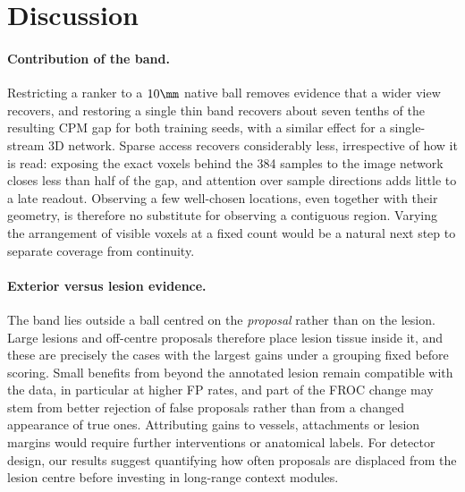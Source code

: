 \section{Discussion}
\label{sec:discussion}

\paragraph{Contribution of the band.}
Restricting a ranker to a $10\mm$ native ball removes evidence that a wider view recovers, and restoring a single thin band recovers about seven tenths of the resulting CPM gap for both training seeds, with a similar effect for a single-stream 3D network. Sparse access recovers considerably less, irrespective of how it is read: exposing the exact voxels behind the 384 samples to the image network closes less than half of the gap, and attention over sample directions adds little to a late readout. Observing a few well-chosen locations, even together with their geometry, is therefore no substitute for observing a contiguous region. Varying the arrangement of visible voxels at a fixed count would be a natural next step to separate coverage from continuity.

\paragraph{Exterior versus lesion evidence.}
The band lies outside a ball centred on the \emph{proposal} rather than on the lesion. Large lesions and off-centre proposals therefore place lesion tissue inside it, and these are precisely the cases with the largest gains under a grouping fixed before scoring. Small benefits from beyond the annotated lesion remain compatible with the data, in particular at higher FP rates, and part of the FROC change may stem from better rejection of false proposals rather than from a changed appearance of true ones. Attributing gains to vessels, attachments or lesion margins would require further interventions or anatomical labels. For detector design, our results suggest quantifying how often proposals are displaced from the lesion centre before investing in long-range context modules.

